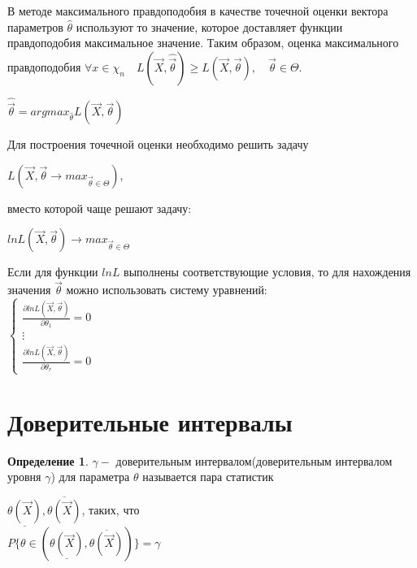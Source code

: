 \documentclass[a4paper, 12pt]{article}
\theoremstyle{definition}
\newtheorem{definition}{Определение}[section]
\theoremstyle{leads}
\theoremstyle{example}
\begin{document}
В методе максимального правдоподобия в качестве точечной оценки вектора параметров $\hat{\theta}$ используют то значение, которое доставляет функции правдоподобия максимальное значение. Таким образом, оценка максимального правдоподобия $\forall x \in \chi_n \quad L(\vec{X}, \hat{\vec{\theta}}) \geq L(\vec{X}, \vec{\theta}), \quad \vec{\theta} \in \Theta$.\\
\begin{center}
	\centering
	$\hat{\vec{\theta}} = arg max_{\hat{\theta}} L(\vec{X}, \vec{\theta})$
\end{center}  

Для построения точечной оценки необходимо решить задачу 
\begin{center}
	\centering
	$L(\vec{X}, \vec{\theta} \longrightarrow max_{\vec{\theta} \in \Theta})$,
\end{center}
вместо которой чаще решают задачу:
\begin{center}
	\centering
	$ln L(\vec{X}, \vec{\theta}) \longrightarrow max_{\vec{\theta} \in \Theta}$
\end{center}
Если для функции $ln L$ выполнены соответствующие условия, то для нахождения значения $\vec{\theta}$ можно использовать систему уравнений:\\
$\left \{
\begin{array}{ccc}
\frac{\partial ln L(\vec{X}, \vec{\theta})}{\partial \theta_1} = 0\\
\vdots\\
\frac{\partial ln L(\vec{X}, \vec{\theta})}{\partial \theta_r} = 0
\end{array}
\right.$

\section{Доверительные интервалы}
\begin{definition}
	$\gamma - $ доверительным интервалом(доверительным интервалом уровня $\gamma$) для параметра $\theta$ называется пара статистик\\
	\begin{center}
		\centering
		$\underline{\theta(\vec{X})}, \overline{\theta(\vec{X})}$, таких, что
		\\$P\{\theta \in (\underline{\theta(\vec{X})}, \overline{\theta(\vec{X})})\} = \gamma $	
	\end{center}
\end{definition}	
\end{document}
